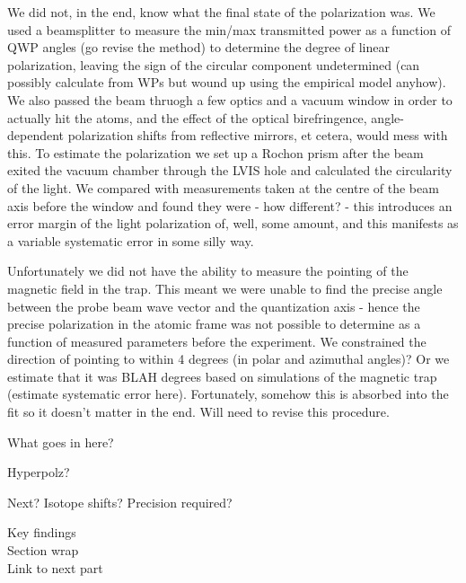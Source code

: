 We did not, in the end, know what the final state of the polarization was.
	We used a beamsplitter to measure the min/max transmitted power as a function of QWP angles (go revise the method) to determine the degree of linear polarization, leaving the sign of the circular component undetermined (can possibly calculate from WPs but wound up using the empirical model anyhow).
	We also passed the beam thruogh a few optics and a vacuum window in order to actually hit the atoms, and the effect of the optical birefringence, angle-dependent polarization shifts from reflective mirrors, et cetera, would mess with this.
	To estimate the polarization we set up a Rochon prism after the beam exited the vacuum chamber through the LVIS hole and calculated the circularity of the light.
	We compared with measurements taken at the centre of the beam axis before the window and found they were - how different? - this introduces an error margin of the light polarization of, well, some amount, and this manifests as a variable systematic error in some silly way.

Unfortunately we did not have the ability to measure the pointing of the magnetic field in the trap.
	This meant we were unable to find the precise angle between the probe beam wave vector and the quantization axis - hence the precise polarization in the atomic frame was not possible to determine as a function of measured parameters before the experiment.
	We constrained the direction of pointing to within 4 degrees (in polar and azimuthal angles)? Or we estimate that it was BLAH degrees based on simulations of the magnetic trap (estimate systematic error here).
	Fortunately, somehow this is absorbed into the fit so it doesn't matter in the end.
	Will need to revise this procedure.
	 




What goes in here?




Hyperpolz?


Next? Isotope shifts? Precision required?


Key findings\\
Section wrap\\
Link to next part
